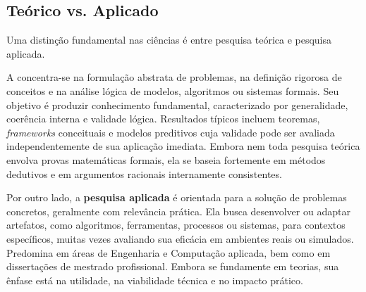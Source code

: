 



\subsection{Teórico vs. Aplicado}

Uma distinção fundamental nas ciências é entre pesquisa teórica e pesquisa aplicada.

A  concentra-se na formulação abstrata de problemas, na definição rigorosa de conceitos e na análise lógica de modelos, algoritmos ou sistemas formais. 
Seu objetivo é produzir conhecimento fundamental, caracterizado por generalidade, coerência interna e validade lógica. 
Resultados típicos incluem teoremas, \textit{frameworks} conceituais e modelos preditivos cuja validade pode ser avaliada independentemente de sua aplicação imediata. 
Embora nem toda pesquisa teórica envolva provas matemáticas formais, ela se baseia fortemente em métodos dedutivos e em argumentos racionais internamente consistentes.

Por outro lado, a \textbf{pesquisa aplicada} é orientada para a solução de problemas concretos, geralmente com relevância prática. 
Ela busca desenvolver ou adaptar artefatos, como algoritmos, ferramentas, processos ou sistemas, para contextos específicos, muitas vezes avaliando sua eficácia em ambientes reais ou simulados. 
Predomina em áreas de Engenharia e Computação aplicada, bem como em dissertações de mestrado profissional. 
Embora se fundamente em teorias, sua ênfase está na utilidade, na viabilidade técnica e no impacto prático.

